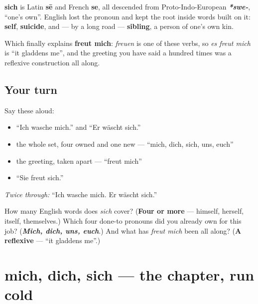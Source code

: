 \begin{cousinweb}
\textbf{sich} is Latin \textbf{sē} and French \textbf{se}, all descended from Proto-Indo-European \emph{\textbf{*swe-}}, \textquotedblleft{}one's own\textquotedblright{}. English lost the pronoun and kept the root inside words built on it: \textbf{self}, \textbf{suicide}, and — by a long road — \textbf{sibling}, a person of one's own kin.

Which finally explains \textbf{freut mich}: \emph{freuen} is one of these verbs, so \emph{es freut mich} is \textquotedblleft{}it gladdens me\textquotedblright{}, and the greeting you have said a hundred times was a reflexive construction all along.
\end{cousinweb}

\subsection*{Your turn}
Say these aloud:

\begin{itemize}
\raggedright
  \item \textquotedblleft{}Ich wasche mich.\textquotedblright{} and \textquotedblleft{}Er wäscht sich.\textquotedblright{}
  \item the whole set, four owned and one new — \textquotedblleft{}mich, dich, sich, uns, euch\textquotedblright{}
  \item the greeting, taken apart — \textquotedblleft{}freut mich\textquotedblright{}
  \item \textquotedblleft{}Sie freut sich.\textquotedblright{}
\end{itemize}

\emph{Twice through:} \textquotedblleft{}Ich wasche mich. Er wäscht sich.\textquotedblright{}

\begin{tcolorbox}[breakable,colback=teal!4,colframe=teal!35!black,title={Before you move on}]
How many English words does \emph{sich} cover? (\textbf{Four or more} — himself, herself, itself, themselves.) Which four done-to pronouns did you already own for this job? (\emph{\textbf{Mich, dich, uns, euch}}.) And what has \emph{freut mich} been all along? (\textbf{A reflexive} — \textquotedblleft{}it gladdens me\textquotedblright{}.)
\end{tcolorbox}
\section[Practice]{mich, dich, sich — the chapter, run cold}

